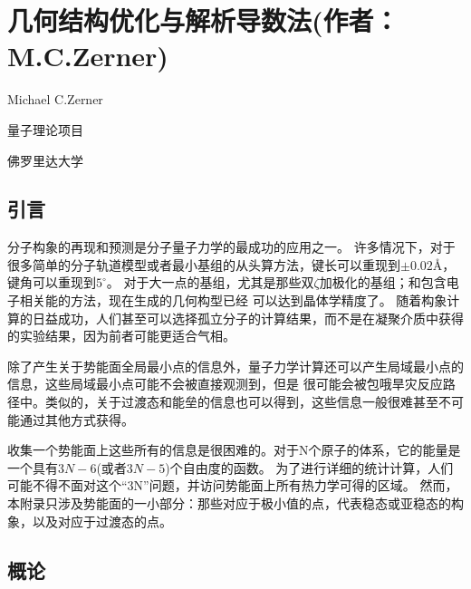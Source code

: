 \chapter{几何结构优化与解析导数法(作者：M.C.Zerner)}
Michael C.Zerner

量子理论项目

佛罗里达大学
\section{引言}

分子构象的再现和预测是分子量子力学的最成功的应用之一。
许多情况下，对于很多简单的分子轨道模型或者最小基组的从头算方法，键长可以重现到$\pm 0.02$\r A，
键角可以重现到$5^{\circ}$。
对于大一点的基组，尤其是那些双$\zeta$加极化的基组；和包含电子相关能的方法，现在生成的几何构型已经
可以达到晶体学精度了。
随着构象计算的日益成功，人们甚至可以选择孤立分子的计算结果，而不是在凝聚介质中获得的实验结果，因为前者可能更适合气相。

除了产生关于势能面全局最小点的信息外，量子力学计算还可以产生局域最小点的信息，这些局域最小点可能不会被直接观测到，但是
很可能会被包哦旱灾反应路径中。类似的，关于过渡态和能垒的信息也可以得到，这些信息一般很难甚至不可能通过其他方式获得。

收集一个势能面上这些所有的信息是很困难的。对于N个原子的体系，它的能量是一个具有$3N-6$(或者$3N-5$)个自由度的函数。
为了进行详细的统计计算，人们可能不得不面对这个“3N”问题，并访问势能面上所有热力学可得的区域。
然而，本附录只涉及势能面的一小部分：那些对应于极小值的点，代表稳态或亚稳态的构象，以及对应于过渡态的点。
\section{概论}

